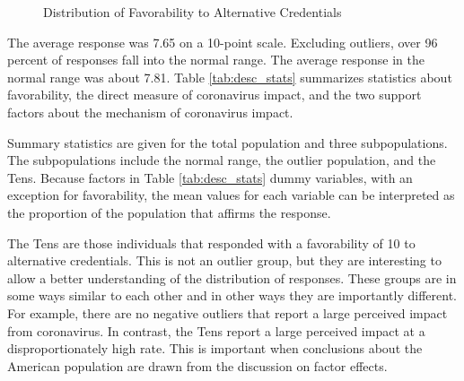 \documentclass[review]{elsarticle}
\begin{document}
\begin{figure}[h!]
    \centering
    \caption{Distribution of Favorability to Alternative Credentials}
    \label{fig:one}
\end{figure}

The average response was 7.65 on a 10-point scale.
Excluding outliers, over 96 percent of responses fall into the normal range.
The average response in the normal range was about 7.81.
Table \ref{tab:desc_stats} summarizes statistics about favorability,
the direct measure of coronavirus impact,
and the two support factors about the mechanism of coronavirus impact.

Summary statistics are given for the total population and three subpopulations.
The subpopulations include the normal range, the outlier population, and the Tens.
Because factors in Table \ref{tab:desc_stats} dummy variables,
with an exception for favorability,
the mean values for each variable can be interpreted as the proportion of the population
that affirms the response.

The Tens are those individuals that responded with a favorability of 10 to alternative credentials.
This is not an outlier group, but they are interesting to allow a better understanding of the distribution of responses.
These groups are in some ways similar to each other and in other ways they are importantly different.
For example, there are no negative outliers that report a large perceived impact from coronavirus.
In contrast, the Tens report a large perceived impact at a disproportionately high rate.
This is important when conclusions about the American population are drawn from the discussion on factor effects.
\end{document}
